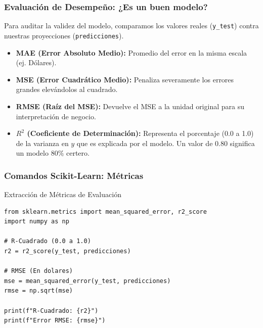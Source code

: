 \documentclass{beamer}
\begin{document}
\begin{frame}
\frametitle{Evaluación de Desempeño: ¿Es un buen modelo?}
Para auditar la validez del modelo, comparamos los valores reales (\texttt{y\_test}) contra nuestras proyecciones (\texttt{predicciones}).

\begin{itemize}
    \item \textbf{MAE (Error Absoluto Medio):} Promedio del error en la misma escala (ej. Dólares).
    \item \textbf{MSE (Error Cuadrático Medio):} Penaliza severamente los errores grandes elevándolos al cuadrado.
    \item \textbf{RMSE (Raíz del MSE):} Devuelve el MSE a la unidad original para su interpretación de negocio.
    \item \textbf{$R^2$ (Coeficiente de Determinación):} Representa el porcentaje (0.0 a 1.0) de la varianza en $y$ que es explicada por el modelo. Un valor de $0.80$ significa un modelo $80\%$ certero.
\end{itemize}
\end{frame}

\begin{frame}[fragile]
\frametitle{Comandos Scikit-Learn: Métricas}

\begin{block}{Extracción de Métricas de Evaluación}
\begin{lstlisting}
from sklearn.metrics import mean_squared_error, r2_score
import numpy as np

# R-Cuadrado (0.0 a 1.0)
r2 = r2_score(y_test, predicciones)

# RMSE (En dolares)
mse = mean_squared_error(y_test, predicciones)
rmse = np.sqrt(mse) 

print(f"R-Cuadrado: {r2}")
print(f"Error RMSE: {rmse}")
\end{lstlisting}
\end{block}
\end{frame}
\end{document}
